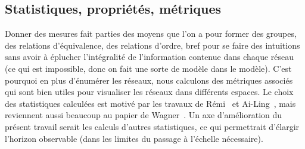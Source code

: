 \documentclass[12pt, a4paper]{article}
\begin{document}
\subsection{Statistiques, propriétés, métriques}
\label{sec:stats}

Donner des mesures fait parties des moyens que l'on a pour former des groupes, des relations d'équivalence, des relations d'ordre, bref pour se faire des intuitions sans avoir à éplucher l'intégralité de l'information contenue dans chaque réseau (ce qui est impossible, donc on fait une sorte de modèle dans le modèle). C'est pourquoi en plus d'énumérer les réseaux, nous calculons des métriques associés qui sont bien utiles pour visualiser les réseaux dans différents espaces. Le choix des statistiques calculées est motivé par les travaux de Rémi~\cite{segretain2023} et Ai-Ling~\cite{bonnet2023}, mais reviennent aussi beaucoup au papier de Wagner~\cite{wagner2008}. Un axe d'amélioration du présent travail serait les calculs d'autres statistiques, ce qui permettrait d'élargir l'horizon observable (dans les limites du passage à l'échelle nécessaire). 
\end{document}
